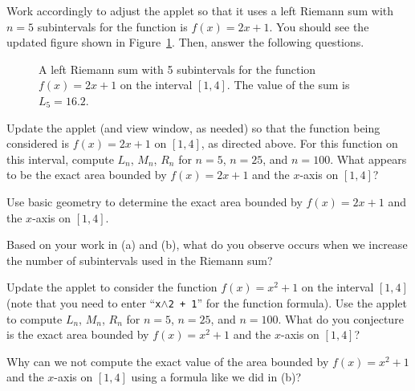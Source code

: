 \begin{pa}
Work accordingly to adjust the applet so that it uses a left Riemann sum with $n = 5$ subintervals for the function is $f(x) = 2x + 1$.  You should see the updated figure shown in Figure~\ref{F:4.3.GGBApplet2}.  Then, answer the following questions.
\begin{figure}[h]
\begin{center}
\caption{A left Riemann sum with 5 subintervals for the function $f(x) = 2x+1$ on the interval $[1,4]$.  The value of the sum is $L_5 = 16.2$.} \label{F:4.3.GGBApplet2}
\end{center}
\end{figure}
\ba
	\item Update the applet (and view window, as needed) so that the function being considered is $f(x) = 2x+1$ on $[1,4]$, as directed above.  For this function on this interval, compute $L_{n}$, $M_{n}$,  $R_{n}$ for $n = 5$, $n = 25$, and $n = 100$.  What appears to be the exact area bounded by $f(x) = 2x+1$ and the $x$-axis on $[1,4]$?
	\item Use basic geometry to determine the exact area bounded by $f(x) = 2x+1$ and the $x$-axis on $[1,4]$.
	\item Based on your work in (a) and (b), what do you observe occurs when we increase the number of subintervals used in the Riemann sum?
	\item Update the applet to consider the function $f(x) = x^2 + 1$ on the interval $[1,4]$ (note that you need to enter ``\texttt{x$\wedge$2 + 1}'' for the function formula).  Use the applet to compute $L_{n}$, $M_{n}$,  $R_{n}$ for $n = 5$, $n = 25$, and $n = 100$.  What do you conjecture is the exact area bounded by $f(x) = x^2+1$ and the $x$-axis on $[1,4]$?
	\item Why can we not compute the exact value of the area bounded by $f(x) = x^2+1$ and the $x$-axis on $[1,4]$ using a formula like we did in (b)?
\ea
\end{pa} 
\afterpa